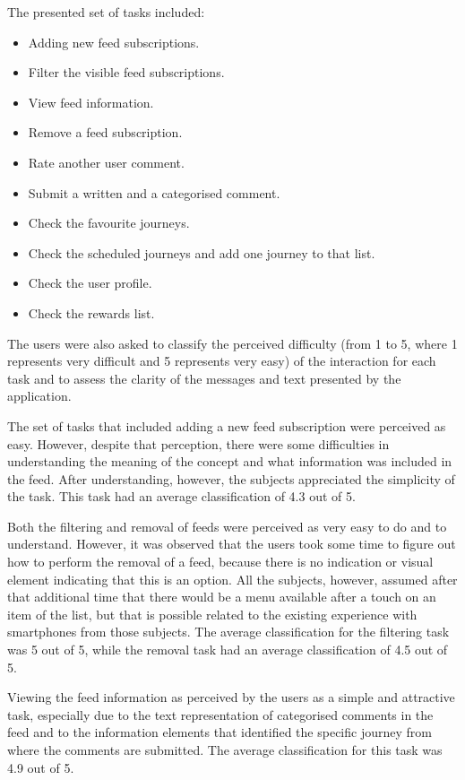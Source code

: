 The presented set of tasks included: 

\begin{itemize}
\item Adding new feed subscriptions.
\item Filter the visible feed subscriptions.
\item View feed information.
\item Remove a feed subscription.
\item Rate another user comment.
\item Submit a written and a categorised comment.
\item Check the favourite journeys.
\item Check the scheduled journeys and add one journey to that list.
\item Check the user profile.
\item Check the rewards list.
\end{itemize}

The users were also asked to classify the perceived difficulty (from 1 to 5, where 1 represents very difficult and 5 represents very easy) of the interaction for each task and to assess the clarity of the messages and text presented by the application.

The set of tasks that included adding a new feed subscription were perceived as easy. However, despite that perception, there were some difficulties in understanding the meaning of the concept and what information was included in the feed. After understanding, however, the subjects appreciated the simplicity of the task. This task had an average classification of 4.3 out of 5.

Both the filtering and removal of feeds were perceived as very easy to do and to understand. However, it was observed that the users took some time to figure out how to perform the removal of a feed, because there is no indication or visual element indicating that this is an option. All the subjects, however, assumed after that additional time that there would be a menu available after a touch on an item of the list, but that is possible related to the existing experience with smartphones from those subjects. The average classification for the filtering task was 5 out of 5, while the removal task had an average classification of 4.5 out of 5.

Viewing the feed information as perceived by the users as a simple and attractive task, especially due to the text representation of categorised comments in the feed and to the information elements that identified the specific journey from where the comments are submitted. The average classification for this task was 4.9 out of 5.

